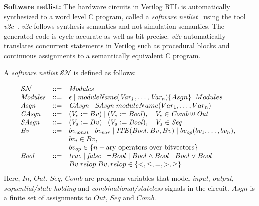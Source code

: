 \documentclass[sigconf]{acmart}
\newcommand{\sjcmt}[1]{{\color{blue} [{#1}]}}
\newcommand{\Omit}[1]{}
\begin{document}
{\bf Software netlist:}
The hardware circuits in Verilog RTL is automatically 
synthesized to a word level C program, called a 
\textit{software netlist}~\cite{mtk2016,mskm2016} using the 
tool {\em v2c}~\cite{mtk2016}. {\em v2c} follows synthesis semantics and not 
simulation semantics. The generated code is cycle-accurate as well as 
bit-precise. {\em v2c} automatically translates concurrent statements 
in Verilog such as procedural blocks and continuous assignments to 
a semantically equivalent C program. 
 
A \textit{software netlist} $\mathcal{SN}$ is defined as follows:
\Omit{
a four-tuple $\langle L, A, l_0, l_e
\rangle$, where $L$ is a finite set of locations, modelling the values of
the program counter in the corresponding sequential code, $l_0 \in L$ is the initial
location, $l_e \in L$ is the error location, and $A \subseteq L \times M
\times L$ is the control flow automaton.  The edges in $A$ are labelled
with a quantifier-free first-order formula over program variables drawn from
the set $M$. These formulas encode an assignment and
take the form $\langle \mathit{In}, \mathit{Out},
\mathit{Seq}, \mathit{Comb}, \mathit{Asgn} \rangle$,
\sjcmt{$M$ is confusing. Is it a set of first order formula
or a set of $Asgn$?}
}
%
\[ 
\begin{array}[t]{@{}lll}
\mathcal{SN} & {:}{:}{=} & \mathit{Modules} \\
\mathit{Modules} & {:}{:}{=} & \epsilon \mid \mathit{moduleName(Var_1,\dots,Var_n)} \{ Asgn \} \;\; Modules \\
\mathit{Asgn} &  {:}{:}{=} & \mathit{CAsgn} \mid \mathit{SAsgn} | moduleName(Var_1,\dots,Var_n)\\
\mathit{CAsgn} & {:}{:}{=} & (V_c := Bv) \mid (V_c := \mathit{Bool}), \quad V_c \in \mathit{Comb} \uplus \mathit{Out} \\
\mathit{SAsgn} & {:}{:}{=} & (V_s := Bv) \mid (V_s := \mathit{Bool}), \quad V_s \in \mathit{Seq} \\
\mathit{Bv} &  {:}{:}{=} & bv_{const} \mid bv_{var} \mid
	\mathit{ITE}(Bool, Bv, Bv) \mid
bv_{op}(bv_1, \ldots, bv_n), \\
& & bv_i \in Bv, \\ 
& & bv_{op} \in \{n-\text{ary operators over bitvectors} \} \\
\mathit{Bool} & {:}{:}{=} & \mathit{true} \mid \mathit{false} \mid \neg{Bool} \mid Bool \land Bool \mid 
Bool \lor Bool \mid \\ 
& & Bv\; relop\; Bv, relop \in \{<,\leq,=,>,\geq\} \\
\end{array}
\]
%
Here, $\mathit{In}$, $\mathit{Out}$, $\mathit{Seq}$, $\mathit{Comb}$
are programs variables that model \emph{input}, \emph{output}, 
\emph{sequential/state-holding} and \emph{combinational/stateless} 
signals in the circuit.  $Asgn$ is a finite set of assignments 
to $Out$, $Seq$ and $Comb$. 
\end{document}
